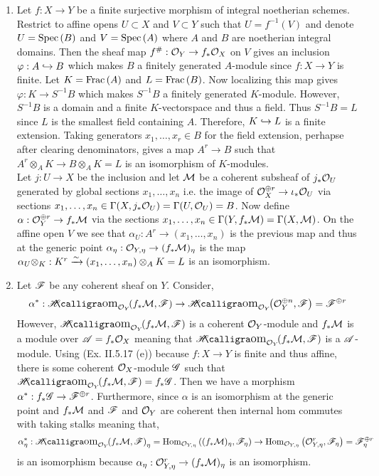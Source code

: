 \documentclass[12pt]{article}
\begin{document}
\begin{enumerate}
\item Let $f : X \to Y$ be a finite surjective morphism of integral noetherian schemes. Restrict to affine opens $U \subset X$ and $V \subset Y$ such that $U = f^{-1}(V)$ and denote $U = \mathrm{Spec}\left( B \right)$ and $V = \mathrm{Spec}\left( A \right)$ where $A$ and $B$ are noetherian integral domains. Then the sheaf map $f^\# : \mathcal{O}_{Y} \to f_* \mathcal{O}_{X}$ on $V$ gives an inclusion $\varphi : A \hookrightarrow B$ which makes $B$ a finitely generated $A$-module since $f : X \to Y$ is finite. Let $K = \mathrm{Frac}\left(A\right)$ and $L = \mathrm{Frac}\left(B\right)$. Now localizing this map gives $\varphi : K \to S^{-1} B$ which makes $S^{-1} B$ a finitely generated $K$-module. However, $S^{-1}B$ is a domain and a finite $K$-vectorspace and thus a field. Thus $S^{-1} B = L$ since $L$ is the smallest field containing $A$. Therefore, $K \hookrightarrow L$ is a finite extension. Taking generators $x_1, \dots, x_r \in B$ for the field extension, perhapse after clearing denominators, gives a map $A^r \to B$ such that $A^r \otimes_A K \to B \otimes_A K = L$ is an isomorphism of $K$-modules.
\bigskip\\
Let $j : U \to X$ be the inclusion and let $\mathcal{M}$ be a coherent subsheaf of $j_* \mathcal{O}_{U}$ generated by global sections $x_1, \dots, x_n$ i.e. the image of $\mathcal{O}_{X}^{\oplus r} \to \iota_* \mathcal{O}_{U}$ via sections $x_1, \dots, x_n \in \Gamma(X, j_* \mathcal{O}_{U}) = \Gamma(U, \mathcal{O}_{U}) = B$.
Now define $\alpha : \mathcal{O}_{Y}^{\oplus r} \to f_* \mathcal{M}$ via the sections $x_1, \dots, x_n \in \Gamma(Y, f_* \mathcal{M}) = \Gamma(X, \mathcal{M})$. On the affine open $V$ we see that $\alpha_U : A^r \to (x_1, \dots, x_n)$ is the previous map and thus at the generic point $\alpha_\eta : \mathcal{O}_{Y, \eta} \to (f_* \mathcal{M})_\eta$ is the map $\alpha_U \otimes_K : K^r \xrightarrow{\sim} (x_1, \dots, x_n) \otimes_A K = L$ is an isomorphism. 

\item Let $\mathscr{F}$ be any coherent sheaf on $Y$. Consider,
\[ \alpha^* : \shHom{\struct{Y}}{f_* \M}{\F} \to \shHom{\struct{Y}}{\struct{Y}^{\oplus n}}{\F} = \F^{\oplus r} \]
However, $\shHom{\struct{Y}}{f_* \M}{\F}$ is a coherent $\mathcal{O}_{Y}$-module and $f_* \mathcal{M}$ is a module over $\mathscr{A} = f_* \mathcal{O}_{X}$ meaning that $\shHom{\struct{Y}}{f_* \M}{\F}$ is a $\mathscr{A}$-module. Using (Ex. II.5.17 (e)) because $f : X \to Y$ is finite and thus affine, there is some coherent $\mathcal{O}_{X}$-module $\mathscr{G}$ such that $\shHom{\struct{Y}}{f_* \M}{\F} = f_* \G$. Then we have a morphism $\alpha^* : f_* \mathscr{G} \to \mathscr{F}^{\oplus r}$. Furthermore, since $\alpha$ is an isomorphism at the generic point and $f_* \mathcal{M}$ and $\mathscr{F}$ and $\mathcal{O}_{Y}$ are coherent then internal hom commutes with taking stalks meaning that,
\[ \alpha^*_\eta : \shHom{\struct{Y}}{f_* \M}{\F}_\eta = \Hom{\stalk{Y}{\eta}}{(f_* \M)_\eta}{\F_\eta} \to \Hom{\stalk{Y}{\eta}}{\stalk{Y}{\eta}^r}{\F_\eta} = \F^{\oplus r}_\eta \]
is an isomorphism because $\alpha_\eta : \mathcal{O}_{Y, \eta}^r \to (f_* \mathcal{M})_\eta$ is an isomorphism.


\end{enumerate}
\end{document}
